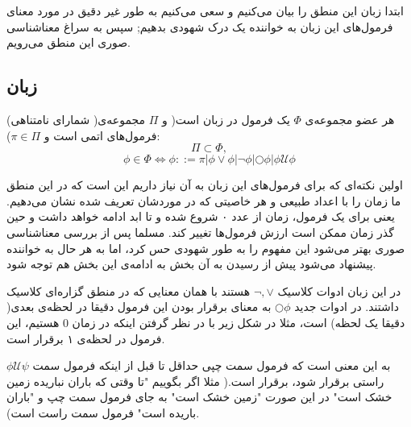 ابتدا زبان این منطق را بیان می‌کنیم و سعی می‌کنیم به طور غیر دقیق در مورد معنای فرمول‌های این زبان به خواننده یک درک شهودی بدهیم; سپس به سراغ معناشناسی صوری این منطق می‌رویم.

\subsection{زبان }
\begin{defn}
	هر عضو مجموعه‌ی $\Phi$ یک فرمول در زبان  است( و $\Pi$ مجموعه‌ی‌( شمارای نامتناهی) فرمول‌های اتمی است و $\pi \in \Pi$):
	$$
	\Pi \subset \Phi,
	$$
	$$
	\phi \in \Phi \Leftrightarrow
	\phi ::= \pi | \phi \lor \phi |
	\neg \phi |
	\bigcirc \phi |
	\phi \mathcal{U}\phi 
$$	
	
\end{defn}
اولین نکته‌ای که برای فرمول‌های این زبان به آن نیاز داریم این است که در این منطق ما زمان را با اعداد طبیعی و هر خاصیتی که در موردشان تعریف شده نشان می‌دهیم. یعنی برای یک فرمول، زمان از عدد ۰ شروع شده و تا ابد ادامه خواهد داشت و حین گذر زمان ممکن است ارزش فرمول‌ها تغییر کند. مسلما پس از بررسی معناشناسی صوری بهتر می‌شود این مفهوم را به طور شهودی حس کرد، اما به هر حال به خواننده پیشنهاد می‌شود پیش از رسیدن به آن بخش به ادامه‌ی این بخش هم توجه شود. 

در این زبان ادوات کلاسیک 
$\neg, \lor$
هستند با همان معنایی که در منطق گزاره‌ای کلاسیک داشتند.  
در ادوات جدید 
$\bigcirc \phi$
به معنای برقرار بودن این فرمول دقیقا در لحظه‌ی بعدی( دقیقا یک لحظه) است، مثلا در شکل زیر با در نظر گرفتن اینکه در زمان 0 هستیم، این فرمول در لحظه‌ی ۱ برقرار است.
	\begin{center}
\end{center}
$\phi \mathcal{U}\psi$
به این معنی است که فرمول سمت چپی حداقل تا قبل از اینکه فرمول سمت راستی برقرار شود، برقرار است.( مثلا اگر بگوییم "تا وقتی که باران نباریده زمین خشک است" در این صورت "زمین خشک است" به جای فرمول سمت چپ و "باران باریده است" فرمول سمت راست است).
\begin{center}
\end{center}

